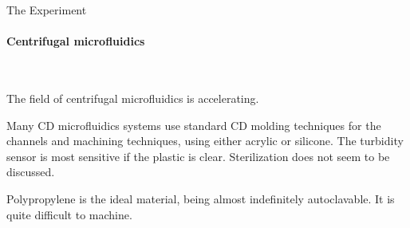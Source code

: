 \documentclass[fleqn,10pt]{article}
\begin{document}
\clearpage
\begin{multicols}{1}
{\Large The Experiment}\\

\paragraph{\textbf{Centrifugal microfluidics}}\

The field of centrifugal microfluidics is accelerating. 

Many CD microfluidics systems use standard CD molding techniques for the channels and machining techniques, using either acrylic or silicone. The turbidity sensor is most sensitive if the plastic is clear. Sterilization does not seem to be discussed. 

Polypropylene is the ideal material, being almost indefinitely autoclavable. It is quite difficult to machine.

\end{multicols}
\end{document}
